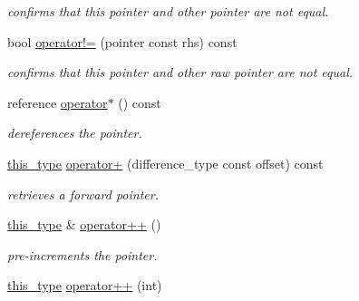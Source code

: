 \begin{DoxyCompactItemize}
\begin{DoxyCompactList}\small\item\em confirms that this pointer and other pointer are not equal. \end{DoxyCompactList}\item 
\hypertarget{classhryky_1_1_intrusive_ptr_a4850219e0e09bbb1a03a85db369469f8}{bool \hyperlink{classhryky_1_1_intrusive_ptr_a4850219e0e09bbb1a03a85db369469f8}{operator!=} (pointer const rhs) const }\label{classhryky_1_1_intrusive_ptr_a4850219e0e09bbb1a03a85db369469f8}

\begin{DoxyCompactList}\small\item\em confirms that this pointer and other raw pointer are not equal. \end{DoxyCompactList}\item 
\hypertarget{classhryky_1_1_intrusive_ptr_a1079b1e2ed0dfe513d609ad05f64c1f2}{reference \hyperlink{classhryky_1_1_intrusive_ptr_a1079b1e2ed0dfe513d609ad05f64c1f2}{operator$\ast$} () const }\label{classhryky_1_1_intrusive_ptr_a1079b1e2ed0dfe513d609ad05f64c1f2}

\begin{DoxyCompactList}\small\item\em dereferences the pointer. \end{DoxyCompactList}\item 
\hypertarget{classhryky_1_1_intrusive_ptr_aa9e65b5fa7be40a26c4e3e386fc0510b}{\hyperlink{classhryky_1_1_intrusive_ptr_a0fb00a7eafa8939e21653f677d1b2989}{this\-\_\-type} \hyperlink{classhryky_1_1_intrusive_ptr_aa9e65b5fa7be40a26c4e3e386fc0510b}{operator+} (difference\-\_\-type const offset) const }\label{classhryky_1_1_intrusive_ptr_aa9e65b5fa7be40a26c4e3e386fc0510b}

\begin{DoxyCompactList}\small\item\em retrieves a forward pointer. \end{DoxyCompactList}\item 
\hypertarget{classhryky_1_1_intrusive_ptr_a5f0638f45388d17bb3d045494b16f09f}{\hyperlink{classhryky_1_1_intrusive_ptr_a0fb00a7eafa8939e21653f677d1b2989}{this\-\_\-type} \& \hyperlink{classhryky_1_1_intrusive_ptr_a5f0638f45388d17bb3d045494b16f09f}{operator++} ()}\label{classhryky_1_1_intrusive_ptr_a5f0638f45388d17bb3d045494b16f09f}

\begin{DoxyCompactList}\small\item\em pre-\/increments the pointer. \end{DoxyCompactList}\item 
\hypertarget{classhryky_1_1_intrusive_ptr_ae82ea1918d3643fbcc2d8ad40368233d}{\hyperlink{classhryky_1_1_intrusive_ptr_a0fb00a7eafa8939e21653f677d1b2989}{this\-\_\-type} \hyperlink{classhryky_1_1_intrusive_ptr_ae82ea1918d3643fbcc2d8ad40368233d}{operator++} (int)}\label{classhryky_1_1_intrusive_ptr_ae82ea1918d3643fbcc2d8ad40368233d}


\end{DoxyCompactItemize}
